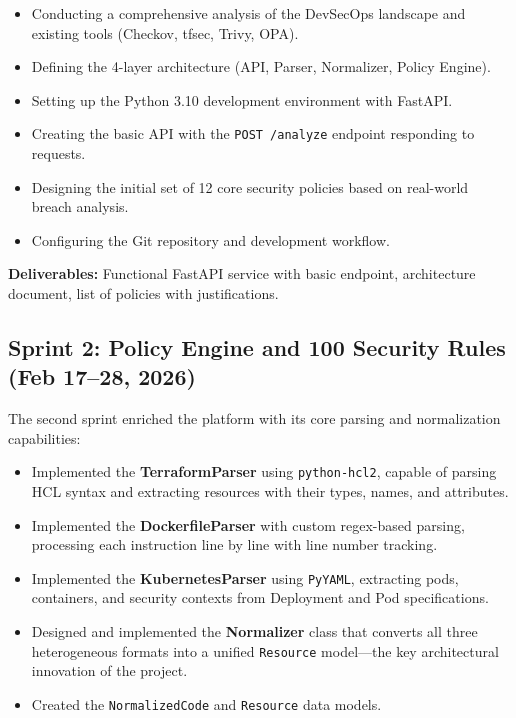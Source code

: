 \begin{itemize}
    \item Conducting a comprehensive analysis of the DevSecOps landscape and existing tools (Checkov, tfsec, Trivy, OPA).
    \item Defining the 4-layer architecture (API, Parser, Normalizer, Policy Engine).
    \item Setting up the Python 3.10 development environment with FastAPI.
    \item Creating the basic API with the \texttt{POST /analyze} endpoint responding to requests.
    \item Designing the initial set of 12 core security policies based on real-world breach analysis.
    \item Configuring the Git repository and development workflow.
\end{itemize}

\noindent\textbf{Deliverables:} Functional FastAPI service with basic endpoint, architecture document, list of policies with justifications.


\subsection*{Sprint 2: Policy Engine and 100 Security Rules (Feb 17--28, 2026)}

The second sprint enriched the platform with its core parsing and normalization capabilities:

\begin{itemize}
    \item Implemented the \textbf{TerraformParser} using \texttt{python-hcl2}, capable of parsing HCL syntax and extracting resources with their types, names, and attributes.
    \item Implemented the \textbf{DockerfileParser} with custom regex-based parsing, processing each instruction line by line with line number tracking.
    \item Implemented the \textbf{KubernetesParser} using \texttt{PyYAML}, extracting pods, containers, and security contexts from Deployment and Pod specifications.
    \item Designed and implemented the \textbf{Normalizer} class that converts all three heterogeneous formats into a unified \texttt{Resource} model—the key architectural innovation of the project.
    \item Created the \texttt{NormalizedCode} and \texttt{Resource} data models.
\end{itemize}

